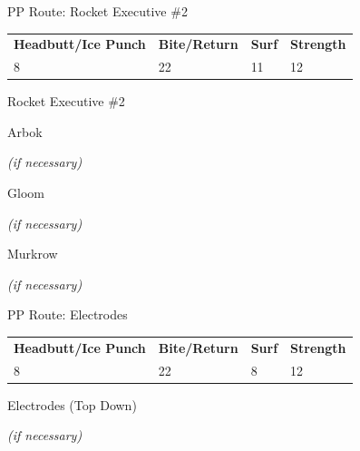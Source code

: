 \begin{paracol}{2}
\switchcolumn*
\begin{misc}{PP Route: Rocket Executive \#2}
	\varwb
	\begin{tabu} to \textwidth {X[6,c] X[5,c] X[4,c] X[4,c]}
		\textbf{Headbutt/Ice Punch} & \textbf{Bite/Return} & \textbf{Surf} & \textbf{Strength}\\ 
		8 & 22 & 11 & 12
	\end{tabu}
	\varwe
\end{misc}

\switchcolumn
\begin{trainer}{Rocket Executive \#2}
	\varwb
	\begin{fightSection}{Arbok}
		\item {} \surf
		\begin{notes}
			\small{\item {} \bite{} \textit{(if necessary)}}
		\end{notes}
	\end{fightSection}
	\begin{fightSection}{Gloom}
		\item {} \strength
		\begin{notes}
			\small{\item {} \bite{} \textit{(if necessary)}}
		\end{notes}
	\end{fightSection}
	\begin{fightSection}{Murkrow}
		\item {} \strength
		\begin{notes}
			\small{\item {} \bite{} \textit{(if necessary)}}
		\end{notes}
	\end{fightSection}
	\varwe
\end{trainer}

\switchcolumn*
\begin{misc}{PP Route: Electrodes}
	\varwb
	\begin{tabu} to \textwidth {X[6,c] X[5,c] X[4,c] X[4,c]}
		\textbf{Headbutt/Ice Punch} & \textbf{Bite/Return} & \textbf{Surf} & \textbf{Strength}\\ 
		8 & 22 & 8 & 12
	\end{tabu}
	\varwe
\end{misc}

\switchcolumn
\begin{trainer}{Electrodes (Top Down)}
	\varwb
	\begin{notes}
		\item {} \surf{} \trainerHlTwo{3x}
		\begin{notes}
			\small{\item {} \bite{} \textit{(if necessary)}}
		\end{notes}
	\end{notes}
	\varwe
\end{trainer}


\end{paracol}
